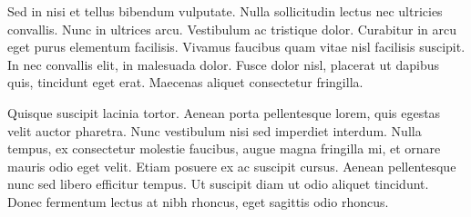\documentclass[12pt,a4paper]{article}
\begin{document}
Sed in nisi et tellus bibendum vulputate. Nulla sollicitudin lectus nec ultricies convallis. Nunc in ultrices arcu. Vestibulum ac tristique dolor. Curabitur in arcu eget purus elementum facilisis. Vivamus faucibus quam vitae nisl facilisis suscipit. In nec convallis elit, in malesuada dolor. Fusce dolor nisl, placerat ut dapibus quis, tincidunt eget erat. Maecenas aliquet consectetur fringilla.

Quisque suscipit lacinia tortor. Aenean porta pellentesque lorem, quis egestas velit auctor pharetra. Nunc vestibulum nisi sed imperdiet interdum. Nulla tempus, ex consectetur molestie faucibus, augue magna fringilla mi, et ornare mauris odio eget velit. Etiam posuere ex ac suscipit cursus. Aenean pellentesque nunc sed libero efficitur tempus. Ut suscipit diam ut odio aliquet tincidunt. Donec fermentum lectus at nibh rhoncus, eget sagittis odio rhoncus.
\end{document}

